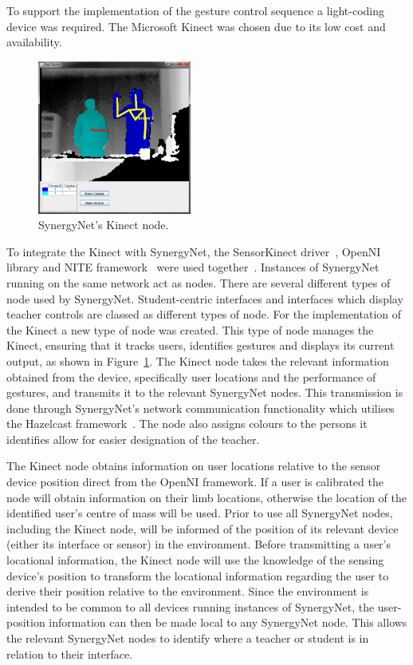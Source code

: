 \documentclass[link]{IWCOMP}
\begin{document}
To support the implementation of the gesture control sequence a light-coding device was required.
The Microsoft Kinect was chosen due to its low cost and availability.

\begin{figure}[h]
   \centering
   \includegraphics[width=0.45\textwidth]{figures/kinect_node.png}
   \caption{SynergyNet's Kinect node.}
   \label{fig:kinectNode}
\end{figure}

To integrate the Kinect with SynergyNet, the SensorKinect driver~\cite{Avin2011}, OpenNI library and NITE framework~\cite{Organisation2011} were used together~\cite{Davison2012}.
Instances of SynergyNet running on the same network act as nodes.
There are several different types of node used by SynergyNet.
Student-centric interfaces and interfaces which display teacher controls are classed as different types of node.
For the implementation of the Kinect a new type of node was created.
This type of node manages the Kinect, ensuring that it tracks users, identifies gestures and displays its current output, as shown in Figure~\ref{fig:kinectNode}.
The Kinect node takes the relevant information obtained from the device, specifically user locations and the performance of gestures, and transmits it to the relevant SynergyNet nodes.
This transmission is done through SynergyNet's network communication functionality which utilises the Hazelcast framework~\cite{Hazelcast2009}.
The node also assigns colours to the persons it identifies allow for easier designation of the teacher.

The Kinect node obtains information on user locations relative to the sensor device position direct from the OpenNI framework.
If a user is calibrated the node will obtain information on their limb locations, otherwise the location of the identified user's centre of mass will be used.
Prior to use all SynergyNet nodes, including the Kinect node, will be informed of the position of its relevant device (either its interface or sensor) in the environment.
Before transmitting a user's locational information, the Kinect node will use the knowledge of the sensing device's position to transform the locational information regarding the user to derive their position relative to the environment.
Since the environment is intended to be common to all devices running instances of SynergyNet, the user-position information can then be made local to any SynergyNet node.
This allows the relevant SynergyNet nodes to identify where a teacher or student is in relation to their interface.
\end{document}
